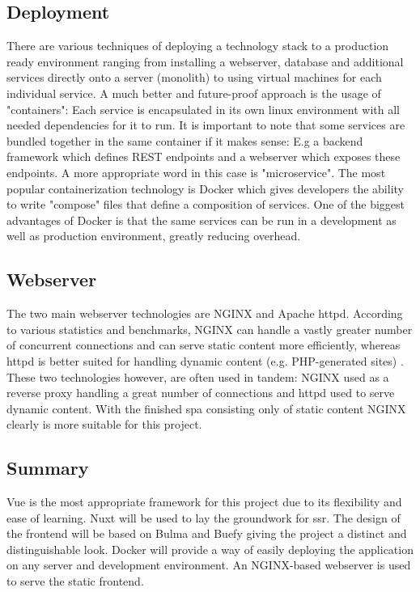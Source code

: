 \subsection{Deployment}
There are various techniques of deploying a technology stack to a production ready environment ranging from installing a webserver, database and additional services directly onto a server (monolith) to using virtual machines for each individual service. A much better and future-proof approach is the usage of "containers": Each service is encapsulated in its own linux environment with all needed dependencies for it to run. It is important to note that some services are bundled together in the same container if it makes sense: E.g a backend framework which defines REST endpoints and a webserver which exposes these endpoints. A more appropriate word in this case is "microservice". The most popular containerization technology is Docker which gives developers the ability to write "compose" files that define a composition of services. One of the biggest advantages of Docker is that the same services can be run in a development as well as production environment, greatly reducing overhead.

\subsection{Webserver}
The two main webserver technologies are NGINX and Apache httpd. According to various statistics and benchmarks, NGINX can handle a vastly greater number of concurrent connections and can serve static content more efficiently, whereas httpd is better suited for handling dynamic content (e.g. PHP-generated sites) \cite{NGINXvsApache:online}. These two technologies however, are often used in tandem: NGINX used as a reverse proxy handling a great number of connections and httpd used to serve dynamic content. With the finished \acrfull{spa} consisting only of static content NGINX clearly is more suitable for this project.

\subsection{Summary}
Vue is the most appropriate framework for this project due to its flexibility and ease of learning. Nuxt will be used to lay the groundwork for \acrshort{ssr}. The design of the frontend will be based on Bulma and Buefy giving the project a distinct and distinguishable look. Docker will provide a way of easily deploying the application on any server and development environment. An NGINX-based webserver is used to serve the static frontend.

